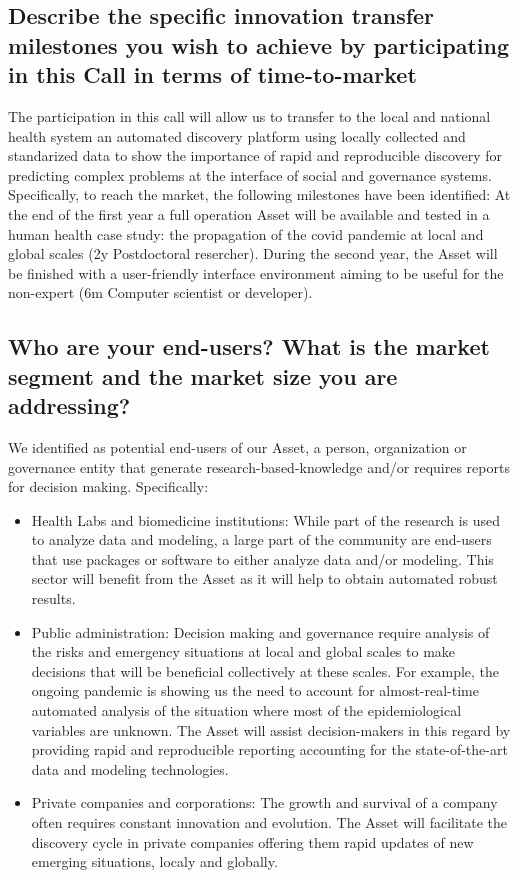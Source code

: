 \documentclass[authoryear,1p,12pt]{elsarticle}
\begin{document}
\subsection{{\bf Describe the specific innovation transfer
  milestones you wish to achieve} by participating in this Call in
  terms of time-to-market}

The participation in this call will allow us to transfer to the local
and national health system an automated discovery platform using
locally collected and standarized data to show the importance of rapid
and reproducible discovery for predicting complex problems at the
interface of social and governance systems. Specifically, to reach the
market, the following milestones have been identified: At the end of
the first year a full operation Asset will be available and tested in
a human health case study: the propagation of the covid pandemic at
local and global scales (2y Postdoctoral resercher). During the second
year, the Asset will be finished with a user-friendly interface
environment aiming to be useful for the non-expert (6m Computer
scientist or developer).
  
  \subsection{{\bf Who are your end-users?} What is the market segment
    and the market size you are addressing?}

  We identified as potential end-users of our Asset, a person,
  organization or governance entity that generate
  research-based-knowledge and/or requires reports for decision
  making. Specifically:

  \begin{itemize}
  \item Health Labs and biomedicine institutions: While part of
    the research is used to analyze data and modeling, a large part
    of the community are end-users that use packages or software to
    either analyze data and/or modeling. This sector will benefit from
    the Asset as it will help to obtain automated robust results.
  \item Public administration: Decision making and governance require
    analysis of the risks and emergency situations at local and global
    scales to make decisions that will be beneficial collectively at
    these scales. For example, the ongoing pandemic is showing us the
    need to account for almost-real-time automated analysis of the
    situation where most of the epidemiological variables are
    unknown. The Asset will assist decision-makers in this regard by
    providing rapid and reproducible reporting accounting for the
    state-of-the-art data and modeling technologies.
  \item Private companies and corporations: The growth and survival of
    a company often requires constant innovation and evolution. The
    Asset will facilitate the discovery cycle in private companies
    offering them rapid updates of new emerging situations, localy and
    globally.
\end{itemize}
\end{document}
